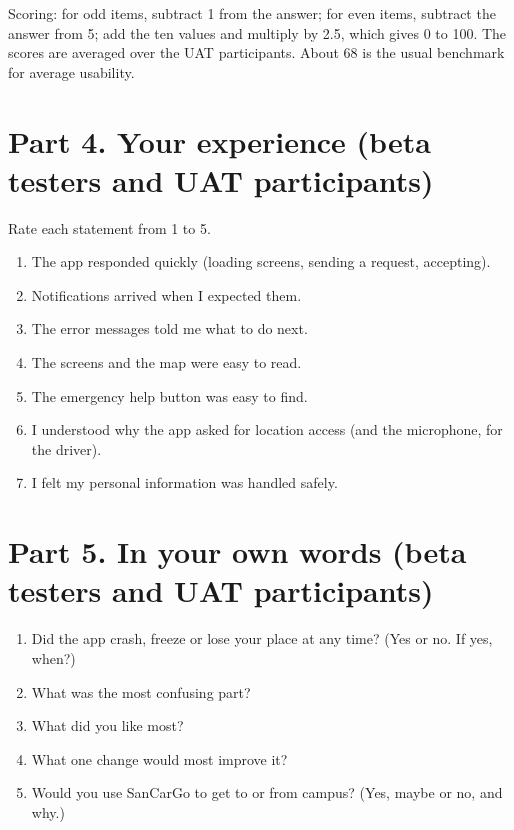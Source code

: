 Scoring: for odd items, subtract 1 from the answer; for even items, subtract the answer from 5; add the ten values and multiply by 2.5, which gives 0 to 100. The scores are averaged over the UAT participants. About 68 is the usual benchmark for average usability.

\section*{Part 4. Your experience (beta testers and UAT participants)}
Rate each statement from 1 to 5.
\begin{enumerate}
    \item The app responded quickly (loading screens, sending a request, accepting).
    \item Notifications arrived when I expected them.
    \item The error messages told me what to do next.
    \item The screens and the map were easy to read.
    \item The emergency help button was easy to find.
    \item I understood why the app asked for location access (and the microphone, for the driver).
    \item I felt my personal information was handled safely.
\end{enumerate}

\section*{Part 5. In your own words (beta testers and UAT participants)}
\begin{enumerate}
    \item Did the app crash, freeze or lose your place at any time? (Yes or no. If yes, when?)
    \item What was the most confusing part?
    \item What did you like most?
    \item What one change would most improve it?
    \item Would you use SanCarGo to get to or from campus? (Yes, maybe or no, and why.)
\end{enumerate}

